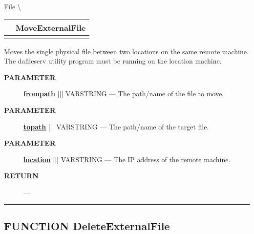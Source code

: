 \hypertarget{ecldoc:file.moveexternalfile}{}
\hspace{0pt} \hyperlink{ecldoc:File}{File} \textbackslash 

{\renewcommand{\arraystretch}{1.5}
\begin{tabularx}{\textwidth}{|>{\raggedright\arraybackslash}l|X|}
\hline
\hspace{0pt}\mytexttt{\color{red} } & \textbf{MoveExternalFile} \\
\hline
\multicolumn{2}{|>{\raggedright\arraybackslash}X|}{\hspace{0pt}\mytexttt{\color{param} (varstring location, varstring frompath, varstring topath)}} \\
\hline
\end{tabularx}
}

\par





Moves the single physical file between two locations on the same remote machine. The dafileserv utility program must be running on the location machine.






\par
\begin{description}
\item [\colorbox{tagtype}{\color{white} \textbf{\textsf{PARAMETER}}}] \textbf{\underline{frompath}} ||| VARSTRING --- The path/name of the file to move.
\item [\colorbox{tagtype}{\color{white} \textbf{\textsf{PARAMETER}}}] \textbf{\underline{topath}} ||| VARSTRING --- The path/name of the target file.
\item [\colorbox{tagtype}{\color{white} \textbf{\textsf{PARAMETER}}}] \textbf{\underline{location}} ||| VARSTRING --- The IP address of the remote machine.
\end{description}







\par
\begin{description}
\item [\colorbox{tagtype}{\color{white} \textbf{\textsf{RETURN}}}] \textbf{} --- 
\end{description}




\rule{\linewidth}{0.5pt}
\subsection*{\textsf{\colorbox{headtoc}{\color{white} FUNCTION}
DeleteExternalFile}}

